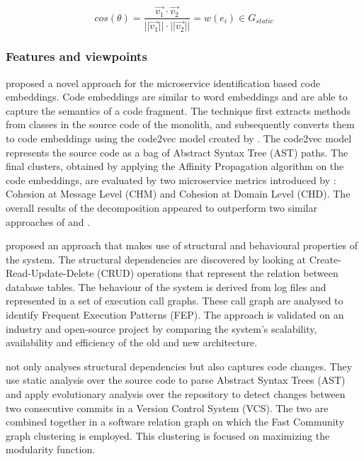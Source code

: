 

\begin{equation}
    cos(\theta) = \frac{
    \overrightarrow{v_1} \cdot \overrightarrow{v_2}
    }
    {
    \lvert\lvert\overrightarrow{v_1}\rvert\rvert
    \cdot
    \lvert\lvert\overrightarrow{v_2}\rvert\rvert
    }
    = w(e_i) \in G_{static}
\end{equation}

\subsubsection{Features and viewpoints}
\citeauthor{al2021microservice} \cite{al2021microservice} proposed a novel approach for the microservice identification based code embeddings. Code embeddings are similar to word embeddings and are able to capture the semantics of a code fragment. The technique first extracts methods from classes in the source code of the monolith, and subsequently converts them to code embeddings using the code2vec model created by \citeauthor{alon2019code2vec} \cite{alon2019code2vec}. The code2vec model represents the source code as a bag of Abstract Syntax Tree (AST) paths. The final clusters, obtained by applying the Affinity Propagation algorithm on the code embeddings, are evaluated by two microservice metrics introduced by \citeauthor{jin2018functionality} \cite{jin2018functionality}: Cohesion at Message Level (CHM) and Cohesion at Domain Level (CHD). The overall results of the decomposition appeared to outperform two similar approaches of \citeauthor{jin2018functionality} \cite{jin2018functionality} and \citeauthor{saidani2019towards} \cite{saidani2019towards}. \par
\citeauthor{de2018function} \cite{de2018function} proposed an approach that makes use of structural and behavioural properties of the system. The structural dependencies are discovered by looking at Create-Read-Update-Delete (CRUD) operations that represent the relation between database tables. The behaviour of the system is derived from log files and represented in a set of execution call graphs. These call graph are analysed to identify Frequent Execution Patterns (FEP). The approach is validated on an industry and open-source project by comparing the system's scalability, availability and efficiency of the old and new architecture. \par
\citeauthor{eski2018automatic} \cite{eski2018automatic} not only analyses structural dependencies but also captures code changes. They use static analysis over the source code to parse Abstract Syntax Trees (AST) and apply evolutionary analysis over the repository to detect changes between two consecutive commits in a Version Control System (VCS). The two are combined together in a software relation graph on which the Fast Community graph clustering is employed. This clustering is focused on maximizing the modularity function.
